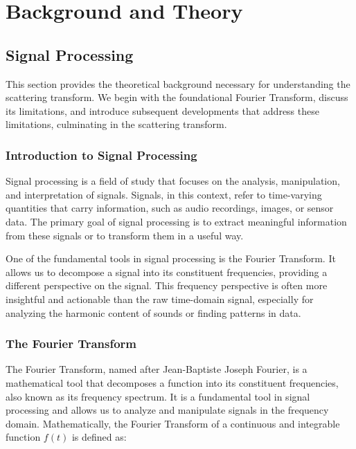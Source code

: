 \chapter{Background and Theory}
\label{ch:background}

\section{Signal Processing}
\label{sec:signal-processing}

This section provides the theoretical background necessary for understanding the scattering transform. We begin with the foundational Fourier Transform, discuss its limitations, and introduce subsequent developments that address these limitations, culminating in the scattering transform.

\subsection{Introduction to Signal Processing}

Signal processing is a field of study that focuses on the analysis, manipulation, and interpretation of signals. Signals, in this context, refer to time-varying quantities that carry information, such as audio recordings, images, or sensor data. The primary goal of signal processing is to extract meaningful information from these signals or to transform them in a useful way.

One of the fundamental tools in signal processing is the Fourier Transform. It allows us to decompose a signal into its constituent frequencies, providing a different perspective on the signal. This frequency perspective is often more insightful and actionable than the raw time-domain signal, especially for analyzing the harmonic content of sounds or finding patterns in data.

\subsection{The Fourier Transform}

The Fourier Transform, named after Jean-Baptiste Joseph Fourier, is a mathematical tool that decomposes a function into its constituent frequencies, also known as its frequency spectrum. It is a fundamental tool in signal processing and allows us to analyze and manipulate signals in the frequency domain. Mathematically, the Fourier Transform of a continuous and integrable function $f(t)$ is defined as:


